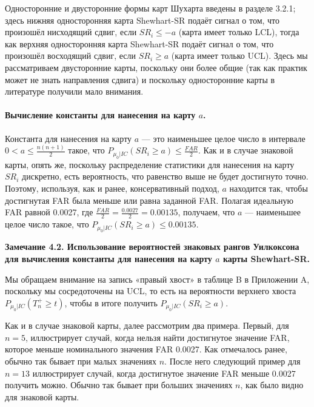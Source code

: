 Односторонние и двусторонние формы карт Шухарта введены в разделе 3.2.1; здесь нижняя односторонняя карта Shewhart-SR подаёт сигнал о том, что произошёл нисходящий сдвиг, если \(SR_i \le -a\) (карта имеет только LCL), тогда как верхняя односторонняя карта Shewhart-SR подаёт сигнал о том, что произошёл восходящий сдвиг, если \(SR_i \ge a\) (карта имеет только UCL). Здесь мы рассматриваем двусторонние карты, поскольку они более общие (так как практик может не знать направления сдвига) и поскольку односторонние карты в литературе получили мало внимания.

\paragraph{Вычисление константы для нанесения на карту \(a\).} Константа для нанесения на карту \(a\) --- это наименьшее целое число в интервале \(0 < a \le \frac{n(n + 1)}{2}\) такое, что \(P_{\mu_0 | IC}(SR_i \ge a) \le \frac{FAR}{2}\). Как и в случае знаковой карты, опять же, поскольку распределение статистики для нанесения на карту \(SR_i\) дискретно, есть вероятность, что равенство выше не будет достигнуто точно. Поэтому, используя, как и ранее, консервативный подход, \(a\) находится так, чтобы достигнутая FAR была меньше или равна заданной FAR. Полагая идеальную FAR равной 0.0027, где \(\frac{FAR}{2} = \frac{0.0027}{2} = 0.00135\), получаем, что \(a\) --- наименьшее целое число такое, что \(P_{\mu_0 | IC}(SR_i \ge a) \le 0.00135\).

\noindent\textbf{Замечание 4.2. Использование вероятностей знаковых рангов Уилкоксона для вычисления константы для нанесения на карту \(a\) карты Shewhart-SR.}

Мы обращаем внимание на запись «правый хвост» в таблице B в Приложении A, поскольку мы сосредоточены на UCL, то есть на вероятности верхнего хвоста \(P_{\mu_0 | IC}(T_n^+ \ge t)\), чтобы в итоге получить \(P_{\mu_0 | IC}(SR_i \ge a)\).

Как и в случае знаковой карты, далее рассмотрим два примера. Первый, для \(n = 5\), иллюстрирует случай, когда нельзя найти достигнутое значение FAR, которое меньше номинального значения FAR 0.0027. Как отмечалось ранее, обычно так бывает при малых значениях \(n\). После него следующий пример для \(n = 13\) иллюстрирует случай, когда достигнутое значение FAR меньше 0.0027 получить можно. Обычно так бывает при больших значениях \(n\), как было видно для знаковой карты.

